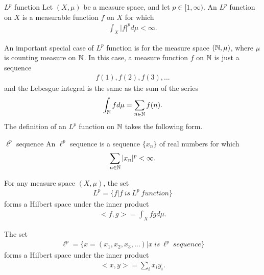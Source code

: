 \begin{definition}{$L^p$ function}{}
    Let $(X,\mu)$ be a measure space, and let $p\in [1,\infty)$. An $L^p$ function on $X$ is a measurable function $f$ on $X$ for which
    \begin{align*}
        \int_{X}^{}|f|^p d\mu < \infty.
    \end{align*}
\end{definition}
An important special case of $L^p$ function is for the measure space $(\mathbb{N},\mu)$, where
$\mu$ is counting measure on $\mathbb{N}$. In this case, a measure function $f$ on $\mathbb{N}$ is just a sequence
\begin{align*}
    f(1),f(2),f(3),...
\end{align*}
and the Lebesgue integral is the same as the sum of the series
\begin{align*}
    \int_{\mathbb{N}}^{} f d\mu = \sum\limits_{n\in \mathbb{N}} f(n).
\end{align*}
The definition of an $L^p$ function on $\mathbb{N}$ takes the following form.
\begin{definition}{$\ell^p$ sequence}{}
    An $\ell^p$ sequence is a sequence $\{x_n\}$ of real numbers for which
    \begin{align*}
        \sum\limits_{n\in \mathbb{N}}|x_n|^p<\infty.
    \end{align*}
\end{definition}

\begin{proposition}{}{}
    For any measure space $(X, \mu)$, the set 
    \begin{align*}
        L^p = \{f|f \ is\  L^p\  function\}
    \end{align*}
    forms a Hilbert space under the inner product
    \begin{align*}
        <f,g> = \int_{X}^{}f\overline{g}d\mu.
    \end{align*}
\end{proposition}


\begin{proposition}{}{}
    The set 
    \begin{align*}
        \ell^p = \{x=(x_1,x_2,x_3,...)| x \ is\  \ell^p\  sequence\}
    \end{align*}
    forms a Hilbert space under the inner product
    \begin{align*}
        <x,y> = \sum\limits_{i}^{}x_i\overline{y_i}.
    \end{align*}
\end{proposition}


